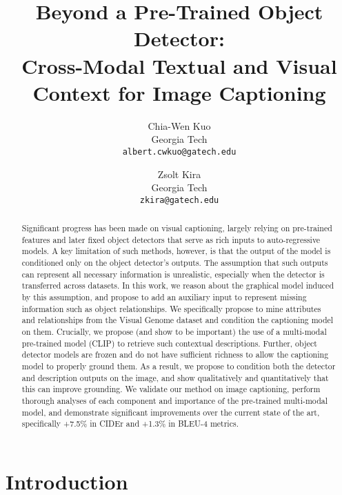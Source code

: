 \documentclass[10pt,twocolumn,letterpaper]{article}
\begin{document}
\title{Beyond a Pre-Trained Object Detector: \\Cross-Modal Textual and Visual Context for Image Captioning}

\author{
Chia-Wen Kuo\\
Georgia Tech\\
{\tt\small albert.cwkuo@gatech.edu}
\and
Zsolt Kira\\
Georgia Tech\\
{\tt\small zkira@gatech.edu}
} \maketitle

\newcommand{\cw}[1]{{\color{blue}{(\textbf{Chia-Wen: }#1)}}}
\newcommand{\zk}[1]{{\color{brown}{(\textbf{Zsolt: }#1)}}}
\newcommand{\js}[1]{{\color{red}{(\textbf{James: }#1)}}}
\newcommand{\nat}[1]{{\color{cyan}{(\textbf{Nathan: }#1)}}}
\newcommand{\jj}[1]{{\color{violet}{(\textbf{Junjiao: }#1)}}}
\newcommand{\amz}[1]{{\color{blue}{(\textbf{Amz: }#1)}}}
\newcommand{\note}[1]{{\color{red}{#1}}}

\renewcommand\cw[1]{}
\renewcommand\zk[1]{}
\renewcommand\js[1]{}
\renewcommand\nat[1]{}
\renewcommand\jj[1]{}
\renewcommand\note[1]{{#1}}

\begin{abstract}
Significant progress has been made on visual captioning, largely relying on pre-trained features and later fixed object detectors that serve as rich inputs to auto-regressive models. A key limitation of such methods, however, is that the output of the model is conditioned only on the object detector's outputs. The assumption that such outputs can represent all necessary information is unrealistic, especially when the detector is transferred across datasets. In this work, we reason about the graphical model induced by this assumption, and propose to add an auxiliary input to represent missing information such as \note{object relationships}. We specifically propose to mine attributes and relationships from the Visual Genome dataset and condition the captioning model on them. Crucially, we propose (and show to be important) the use of a multi-modal pre-trained model (CLIP) to retrieve such contextual descriptions. Further, object detector models are frozen and do not have sufficient richness to allow the captioning model to properly ground them. As a result, we propose to condition both the detector and description outputs on the image, and show qualitatively and quantitatively that this can improve grounding. We validate our method on image captioning, perform thorough analyses of each component and importance of the pre-trained multi-modal model, and demonstrate significant improvements over the current state of the art, specifically +7.5\% in CIDEr and +1.3\% in BLEU-4 metrics.
\end{abstract} \section{Introduction}\label{section:introduction}
\end{document}
